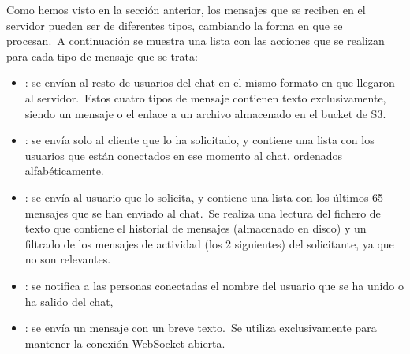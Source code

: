 
Como hemos visto en la sección anterior, los mensajes que se reciben en el servidor pueden ser de diferentes tipos,
cambiando la forma en que se procesan.\ A continuación se muestra una lista con las acciones que se realizan para
cada tipo de mensaje que se trata:

\begin{itemize}
	\item {}: se envían al resto de usuarios del chat en el mismo formato en que llegaron al
	servidor.\ Estos cuatro tipos de mensaje contienen texto exclusivamente, siendo un mensaje o el enlace a un
	archivo almacenado en el bucket de S3.
	\item {}: se envía solo al cliente que lo ha solicitado, y contiene una lista con los usuarios que están
	conectados en ese momento al chat, ordenados alfabéticamente.
	\item {}: se envía al usuario que lo solicita, y contiene una lista con los últimos 65 mensajes que se han
	enviado al chat.\ Se realiza una lectura del fichero de texto que contiene el historial de mensajes (almacenado
	en disco) y un filtrado de los mensajes de actividad (los 2 siguientes) del solicitante, ya que no son relevantes.
	\item {}: se notifica a las personas conectadas el nombre del usuario que se ha unido o ha
	salido del chat, %
	\item {}: se envía un mensaje con un breve texto.\ Se utiliza exclusivamente para mantener la conexión WebSocket
	abierta.
\end{itemize}
